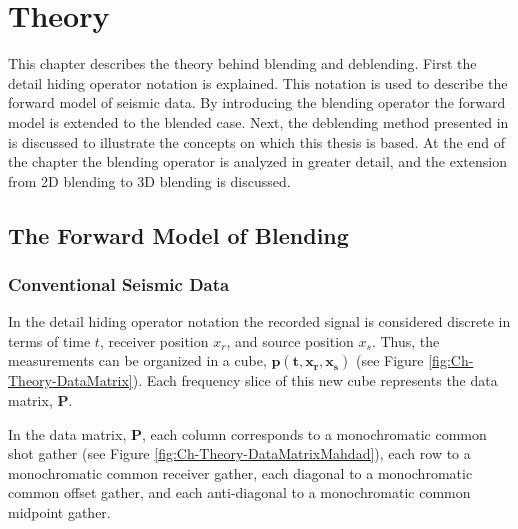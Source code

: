\chapter{Theory} \label{chap:theory}

This chapter describes the theory behind blending and deblending. First the detail hiding operator notation is explained. This notation is used to describe the forward model of seismic data. By introducing the blending operator the forward model is extended to the blended case. Next, the deblending method presented in \citet{Mahdad-Deblending-Method} is discussed to illustrate the concepts on which this thesis is based. At the end of the chapter the blending operator is analyzed in greater detail, and the extension from 2D blending to 3D blending is discussed.

\section{The Forward Model of Blending} \label{sec:Ch-Theory-Operator}

\subsection{Conventional Seismic Data}
In the detail hiding operator notation \citep{Berkhout1982} the recorded signal is considered discrete in terms of time $t$, receiver position $x_r$, and source position $x_s$. Thus, the measurements can be organized in a cube, $\mathbf{p(t,x_r,x_s)}$ (see Figure \ref{fig:Ch-Theory-DataMatrix}). Each frequency slice of this new cube represents the data matrix, $\mathbf{P}$. 

In the data matrix, $\mathbf{P}$, each column corresponds to a monochromatic common shot gather (see Figure \ref{fig:Ch-Theory-DataMatrixMahdad}), each row to a monochromatic common receiver gather, each diagonal to a monochromatic common offset gather, and each anti-diagonal to a monochromatic common midpoint gather. 

